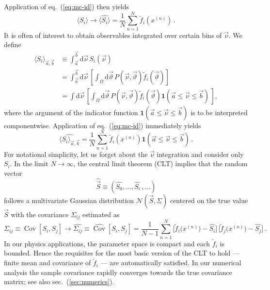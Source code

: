 \documentclass[aps,prd,reprint,nofootinbib,preprintnumbers]{revtex4}
\newcommand{\dual}[1]{\tilde{#1}}
\newcommand{\est}[1]{\widehat{#1}}
\newcommand{\nuvec}{\vec{\nu}}
\newcommand{\refeq}[1]{eq.~(\ref{eq:#1})}
\newcommand{\refsec}[1]{sec.~(\ref{sec:#1})}
\newcommand{\rmdx}[1]{\mbox{d} #1 \,} %
\newcommand{\thvec}{\vec{\vartheta}}
\renewcommand{\theta}{\vartheta}
\newcommand{\vecest}[1]{\widehat{\vec{#1}}}
\DeclareMathOperator{\cov}{Cov}
\begin{document}
Application of \refeq{mc-id} then yields
\begin{equation}
    \langle S_i\rangle \to \widehat{\langle S_i\rangle} = \frac{1}{N} \sum_{n=1}^{N} \dual{f}_i(x^{(n)})\,.
\end{equation}
It is often of interest to obtain observables integrated over certain
bins of $\nuvec$. We define
\begin{align}
    \langle S_i\rangle_{\vec{a},\vec{b}}
    & \equiv \int_{\vec{a}}^{\vec{b}} \rmdx{\nuvec} S_i(\nuvec)\\
    & = \int_{\vec{a}}^{\vec{b}} \rmdx{\nuvec} \left[\int_{\Omega} \rmdx{\vec\theta} P(\nuvec,\thvec) \dual{f}_i(\thvec)  \right]\\
    & = \int \rmdx{\nuvec} \left[\int_{\Omega} \rmdx{\vec\theta}  P(\nuvec,\thvec) \dual{f}_i(\thvec)
        \mathbf{1}(\vec{a} \le \nuvec \le \vec{b})\,
        \right],
\end{align}
where the argument of the indicator function $ \mathbf{1}(\vec{a} \le
\nuvec \le \vec{b})$ is to be interpreted componentwise.
Application of \refeq{mc-id} immediately yields
\begin{equation}
    \label{eq:bin-importance}
    \widehat{\langle S_i\rangle_{\vec{a},\vec{b}}}
    = \frac{1}{N} \sum_{n=1}^{N} \dual{f}_i(x^{(n)})         \mathbf{1}(\vec{a} \le \nuvec \le \vec{b})\,.
\end{equation}
For notational simplicity, let us forget about the $\nuvec$
integration and consider only $S_i$. In the limit $N \to \infty$, the
central limit theorem (CLT) implies that the random vector
\begin{equation}
  \label{eq:angular-obs-vec}
  \vecest{S} \equiv (\est{S_0}, \dots, \est{S_i}\,,
  \dots)
\end{equation}
follows a multivariate Gaussian distribution $\mathcal{N}(\vec{S},
\Sigma)$ centered on the true value $\vec{S}$ with the
covariance $\Sigma_{ij}$ estimated as
\begin{equation}
    \Sigma_{ij} \equiv \cov[S_i,S_j] \to \est{\Sigma_{ij}} \equiv \est{\cov}[{S}_i, {S}_j]
        = \frac{1}{N - 1} \sum_{n=1}^{N} \Big[\dual{f}_i\big(x^{(n)}\big) - \est{S_i}\Big]\,\Big[\dual{f}_j\big(x^{(n)}\big) - \widehat{S_j}\Big]\,.
\end{equation}
In our physics applications, the parameter space is compact and each
$\dual{f}_i$ is bounded. Hence the requisites for the most basic
version of the CLT to hold --- finite mean and covariance of
$\dual{f}_i$ --- are automatically satisfied.
In our numerical analysis the sample covariance rapidly converges towards the true covariance
matrix; see also \refsec{numerics}.\\
\end{document}
